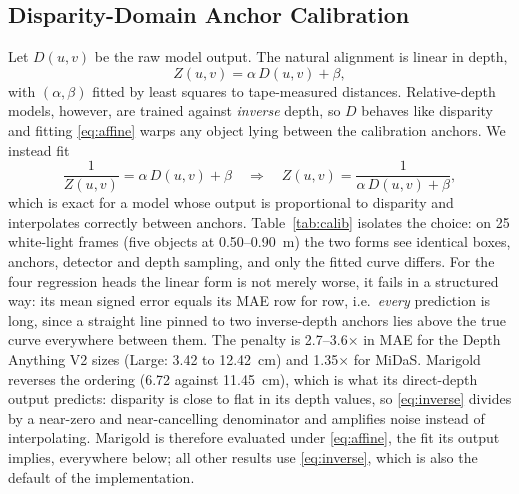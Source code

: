\documentclass[conference]{IEEEtran}
\begin{document}
\subsection{Disparity-Domain Anchor Calibration}
Let $D(u,v)$ be the raw model output. The natural alignment is linear in depth,
\begin{equation}
Z(u,v) = \alpha\,D(u,v) + \beta ,
\label{eq:affine}
\end{equation}
with $(\alpha,\beta)$ fitted by least squares to tape-measured distances.
Relative-depth models, however, are trained against \emph{inverse} depth, so $D$
behaves like disparity and fitting \eqref{eq:affine} warps any object lying
between the calibration anchors. We instead fit
\begin{equation}
\frac{1}{Z(u,v)} = \alpha\,D(u,v) + \beta
\quad\Longrightarrow\quad
Z(u,v) = \frac{1}{\alpha\,D(u,v) + \beta},
\label{eq:inverse}
\end{equation}
which is exact for a model whose output is proportional to disparity and
interpolates correctly between anchors. Table~\ref{tab:calib} isolates the choice:
on 25 white-light frames (five objects at 0.50--0.90~m) the two forms see
identical boxes, anchors, detector and depth sampling, and only the fitted curve
differs. For the four regression heads the linear form is not merely worse, it
fails in a structured way: its mean signed error equals its MAE row for row,
i.e.\ \emph{every} prediction is long, since a straight line pinned to two
inverse-depth anchors lies above the true curve everywhere between them. The
penalty is 2.7--3.6$\times$ in MAE for the Depth Anything V2 sizes (Large:
3.42 to 12.42~cm) and 1.35$\times$ for MiDaS. Marigold reverses the ordering
(6.72 against 11.45~cm), which is what its direct-depth output predicts:
disparity is close to flat in its depth values, so \eqref{eq:inverse} divides by
a near-zero and near-cancelling denominator and amplifies noise instead of
interpolating. Marigold is therefore evaluated under \eqref{eq:affine}, the fit
its output implies, everywhere below; all other results use \eqref{eq:inverse},
which is also the default of the implementation.
\end{document}
